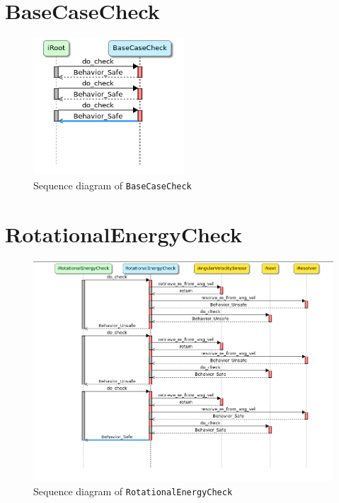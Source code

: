 \documentclass[12pt]{scrreprt}
\begin{document}
\begin{appendices}
\section{BaseCaseCheck}
\label{BaseCaseCheck_app}

\begin{figure}[H]
    \centering
    \includegraphics[width=0.5\textwidth]{Figures/results/modelling_figures/BaseCaseCheck/BaseCaseCheck_seq.png}
    \caption{Sequence diagram of \texttt{BaseCaseCheck}}
    \label{fig:BaseCaseCheck_seq}
\end{figure}

\section{RotationalEnergyCheck}
\label{aRotationalEnergyCheck}

\begin{figure}[H]
    \centering
    \includegraphics[width=\textwidth]{Figures/results/modelling_figures/RotationalEnergyCheck/RotationalEnergyCheck_seq.png}
    \caption{Sequence diagram of \texttt{RotationalEnergyCheck}}
    \label{fig:RotationalEnergyCheck_seq}
\end{figure}



\end{appendices}
\end{document}
